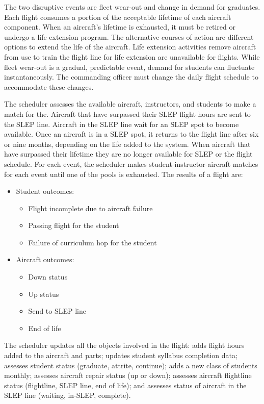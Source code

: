 \documentclass[preprint,12pt]{elsarticle}
\begin{document}
The two disruptive events
are fleet wear-out and change in demand for graduates. Each flight
consumes a portion of the acceptable lifetime of each aircraft
component. When an aircraft's lifetime is exhausted, it must be
retired or undergo a life extension program. The alternative courses
of action are different options to extend the life of the
aircraft. Life extension activities remove aircraft from use to train
the flight line for life extension are unavailable for flights. While
fleet wear-out is a gradual, predictable event, demand for students
can fluctuate instantaneously.  The commanding officer must change the
daily flight schedule to accommodate these changes.


The scheduler assesses the available aircraft, instructors,
and students to make a match for the. Aircraft that have surpassed their SLEP flight hours are
sent to the SLEP line.  Aircraft in the SLEP line wait for an
SLEP spot to become available. Once an aircraft is in a SLEP spot, it
returns to the flight line after six or nine months, depending on the life
added to the system.  When aircraft that have surpassed their lifetime
they are no longer available for SLEP
or the flight schedule. For each event, the scheduler makes
student-instructor-aircraft matches for each event until one of the
pools is exhausted. The results of a flight are:
\begin{itemize}
\item Student outcomes:
  \begin{itemize}
  \item Flight incomplete due to aircraft failure
  \item Passing flight  for the student
  \item Failure of curriculum hop for the student
  \end{itemize}
\item Aircraft outcomes:
  \begin{itemize}
  \item Down status
  \item Up status
  \item Send to SLEP line
  \item End of life
  \end{itemize}
\end{itemize}

The scheduler updates all the objects involved in the flight: adds
flight hours added to the aircraft and parts; updates student syllabus
completion data; assesses student status (graduate, attrite,
continue); adds a new class of students monthly; assesses aircraft
repair status (up or down); assesses aircraft flightline status
(flightline, SLEP line, end of life); and assesses status of aircraft in
the SLEP line (waiting, in-SLEP, complete). 
\end{document}
